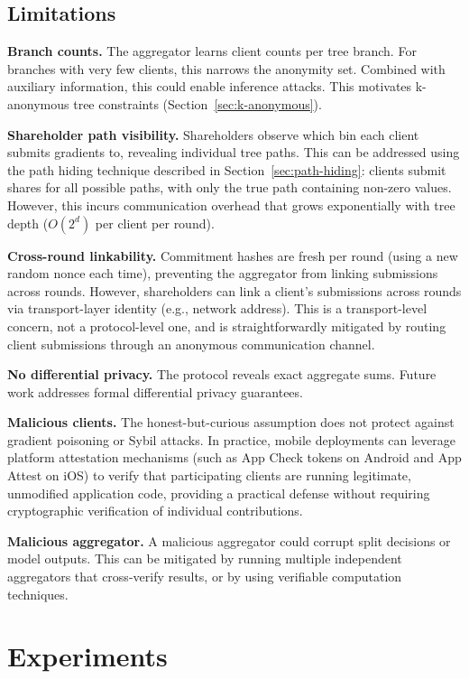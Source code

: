 \documentclass[journal,10pt]{IEEEtran}
\begin{document}
\subsection{Limitations}
\label{sec:limitations}

\textbf{Branch counts.} The aggregator learns client counts per tree branch. For branches with very few clients, this narrows the anonymity set. Combined with auxiliary information, this could enable inference attacks. This motivates k-anonymous tree constraints (Section~\ref{sec:k-anonymous}).

\textbf{Shareholder path visibility.} Shareholders observe which bin each client submits gradients to, revealing individual tree paths. This can be addressed using the path hiding technique described in Section~\ref{sec:path-hiding}: clients submit shares for all possible paths, with only the true path containing non-zero values. However, this incurs communication overhead that grows exponentially with tree depth ($O(2^d)$ per client per round).

\textbf{Cross-round linkability.} Commitment hashes are fresh per round (using a new random nonce each time), preventing the aggregator from linking submissions across rounds. However, shareholders can link a client's submissions across rounds via transport-layer identity (e.g., network address). This is a transport-level concern, not a protocol-level one, and is straightforwardly mitigated by routing client submissions through an anonymous communication channel.

\textbf{No differential privacy.} The protocol reveals exact aggregate sums. Future work addresses formal differential privacy guarantees.

\textbf{Malicious clients.} The honest-but-curious assumption does not protect against gradient poisoning or Sybil attacks. In practice, mobile deployments can leverage platform attestation mechanisms (such as App Check tokens on Android and App Attest on iOS) to verify that participating clients are running legitimate, unmodified application code, providing a practical defense without requiring cryptographic verification of individual contributions.

\textbf{Malicious aggregator.} A malicious aggregator could corrupt split decisions or model outputs. This can be mitigated by running multiple independent aggregators that cross-verify results, or by using verifiable computation techniques.

\section{Experiments}
\end{document}

